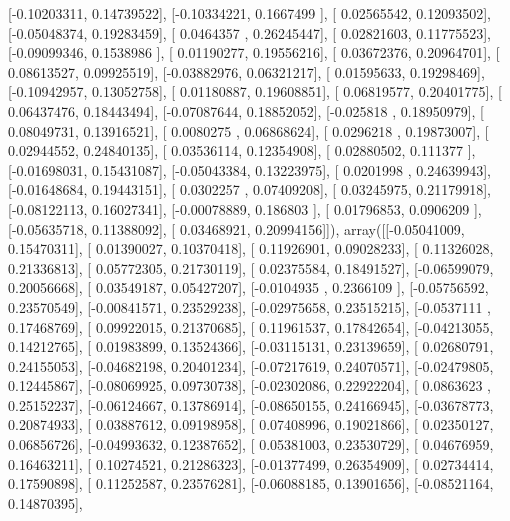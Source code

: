 \documentclass{article}
\begin{document}
       [-0.10203311,  0.14739522],
       [-0.10334221,  0.1667499 ],
       [ 0.02565542,  0.12093502],
       [-0.05048374,  0.19283459],
       [ 0.0464357 ,  0.26245447],
       [ 0.02821603,  0.11775523],
       [-0.09099346,  0.1538986 ],
       [ 0.01190277,  0.19556216],
       [ 0.03672376,  0.20964701],
       [ 0.08613527,  0.09925519],
       [-0.03882976,  0.06321217],
       [ 0.01595633,  0.19298469],
       [-0.10942957,  0.13052758],
       [ 0.01180887,  0.19608851],
       [ 0.06819577,  0.20401775],
       [ 0.06437476,  0.18443494],
       [-0.07087644,  0.18852052],
       [-0.025818  ,  0.18950979],
       [ 0.08049731,  0.13916521],
       [ 0.0080275 ,  0.06868624],
       [ 0.0296218 ,  0.19873007],
       [ 0.02944552,  0.24840135],
       [ 0.03536114,  0.12354908],
       [ 0.02880502,  0.111377  ],
       [-0.01698031,  0.15431087],
       [-0.05043384,  0.13223975],
       [ 0.0201998 ,  0.24639943],
       [-0.01648684,  0.19443151],
       [ 0.0302257 ,  0.07409208],
       [ 0.03245975,  0.21179918],
       [-0.08122113,  0.16027341],
       [-0.00078889,  0.186803  ],
       [ 0.01796853,  0.0906209 ],
       [-0.05635718,  0.11388092],
       [ 0.03468921,  0.20994156]]), array([[-0.05041009,  0.15470311],
       [ 0.01390027,  0.10370418],
       [ 0.11926901,  0.09028233],
       [ 0.11326028,  0.21336813],
       [ 0.05772305,  0.21730119],
       [ 0.02375584,  0.18491527],
       [-0.06599079,  0.20056668],
       [ 0.03549187,  0.05427207],
       [-0.0104935 ,  0.2366109 ],
       [-0.05756592,  0.23570549],
       [-0.00841571,  0.23529238],
       [-0.02975658,  0.23515215],
       [-0.0537111 ,  0.17468769],
       [ 0.09922015,  0.21370685],
       [ 0.11961537,  0.17842654],
       [-0.04213055,  0.14212765],
       [ 0.01983899,  0.13524366],
       [-0.03115131,  0.23139659],
       [ 0.02680791,  0.24155053],
       [-0.04682198,  0.20401234],
       [-0.07217619,  0.24070571],
       [-0.02479805,  0.12445867],
       [-0.08069925,  0.09730738],
       [-0.02302086,  0.22922204],
       [ 0.0863623 ,  0.25152237],
       [-0.06124667,  0.13786914],
       [-0.08650155,  0.24166945],
       [-0.03678773,  0.20874933],
       [ 0.03887612,  0.09198958],
       [ 0.07408996,  0.19021866],
       [ 0.02350127,  0.06856726],
       [-0.04993632,  0.12387652],
       [ 0.05381003,  0.23530729],
       [ 0.04676959,  0.16463211],
       [ 0.10274521,  0.21286323],
       [-0.01377499,  0.26354909],
       [ 0.02734414,  0.17590898],
       [ 0.11252587,  0.23576281],
       [-0.06088185,  0.13901656],
       [-0.08521164,  0.14870395],
\end{document}
